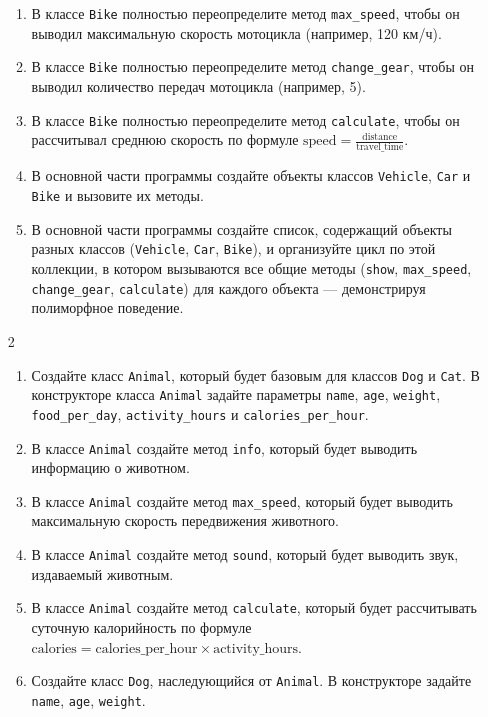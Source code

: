\begin{enumerate}
\begin{enumerate}[leftmargin=*]
    \item В классе \texttt{Bike} полностью переопределите метод \texttt{max\_speed}, чтобы он выводил максимальную скорость мотоцикла (например, 120 км/ч).
    \item В классе \texttt{Bike} полностью переопределите метод \texttt{change\_gear}, чтобы он выводил количество передач мотоцикла (например, 5).
    \item В классе \texttt{Bike} полностью переопределите метод \texttt{calculate}, чтобы он рассчитывал среднюю скорость по формуле \( \text{speed} = \frac{\text{distance}}{\text{travel\_time}} \).
    \item В основной части программы создайте объекты классов \texttt{Vehicle}, \texttt{Car} и \texttt{Bike} и вызовите их методы.
    \item В основной части программы создайте список, содержащий объекты разных классов (\texttt{Vehicle}, \texttt{Car}, \texttt{Bike}), и организуйте цикл по этой коллекции, в котором вызываются все общие методы (\texttt{show}, \texttt{max\_speed}, \texttt{change\_gear}, \texttt{calculate}) для каждого объекта — демонстрируя полиморфное поведение.
\end{enumerate}
\item[2]
\begin{enumerate}[leftmargin=*]
    \item Создайте класс \texttt{Animal}, который будет базовым для классов \texttt{Dog} и \texttt{Cat}. В конструкторе класса \texttt{Animal} задайте параметры \texttt{name}, \texttt{age}, \texttt{weight}, \texttt{food\_per\_day}, \texttt{activity\_hours} и \texttt{calories\_per\_hour}.
    \item В классе \texttt{Animal} создайте метод \texttt{info}, который будет выводить информацию о животном.
    \item В классе \texttt{Animal} создайте метод \texttt{max\_speed}, который будет выводить максимальную скорость передвижения животного.
    \item В классе \texttt{Animal} создайте метод \texttt{sound}, который будет выводить звук, издаваемый животным.
    \item В классе \texttt{Animal} создайте метод \texttt{calculate}, который будет рассчитывать суточную калорийность по формуле \( \text{calories} = \text{calories\_per\_hour} \times \text{activity\_hours} \).
    \item Создайте класс \texttt{Dog}, наследующийся от \texttt{Animal}. В конструкторе задайте \texttt{name}, \texttt{age}, \texttt{weight}.

\end{enumerate}
\end{enumerate}
